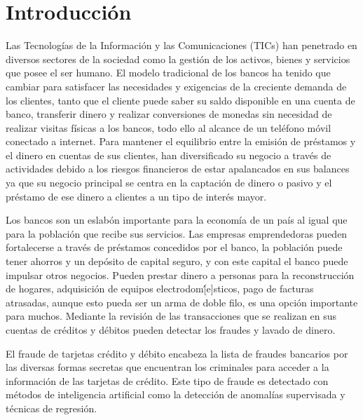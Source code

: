 \section*{Introducci\'{o}n}

 Las Tecnolog\'{i}as de la Informaci\'{o}n y las Comunicaciones (TICs) han penetrado en diversos sectores de la sociedad como la gesti\'{o}n de los activos, bienes y servicios que posee el ser humano. El modelo tradicional de los bancos ha tenido que cambiar para satisfacer las necesidades y exigencias de la creciente demanda de los clientes, tanto que el cliente puede saber su saldo disponible en una cuenta de banco, transferir dinero y realizar conversiones de monedas sin necesidad de realizar visitas f\'{i}sicas a los bancos, todo ello al alcance de un tel\'{e}fono m\'{o}vil conectado a internet. Para mantener el equilibrio entre la emisi\'{o}n de pr\'{e}stamos y el dinero en cuentas de sus clientes, han diversificado su negocio a trav\'{e}s de actividades debido a los riesgos financieros de estar apalancados en sus balances ya que su negocio principal se centra en la captaci\'{o}n de dinero o pasivo y el pr\'{e}stamo de ese dinero a clientes a un tipo de inter\'{e}s mayor.

 Los bancos son un eslab\'{o}n importante para la econom\'{i}a de un pa\'{i}s al igual que para la poblaci\'{o}n que recibe sus servicios. Las empresas emprendedoras pueden fortalecerse a trav\'{e}s de pr\'{e}stamos concedidos por el banco, la poblaci\'{o}n puede tener ahorros y un dep\'{o}sito de capital seguro, y con este capital el banco puede impulsar otros negocios. Pueden prestar dinero a personas para la reconstrucci\'{o}n de hogares, adquisici\'{o}n de equipos electrodom\'[e]sticos, pago de facturas atrasadas, aunque esto pueda ser un arma de doble filo, es una opci\'{o}n importante para muchos. Mediante la revisi\'{o}n de las transacciones que se realizan en sus cuentas de cr\'{e}ditos y d\'{e}bitos pueden detectar los fraudes y lavado de dinero.

 El fraude de tarjetas cr\'{e}dito y d\'{e}bito encabeza la lista de fraudes bancarios por las diversas formas secretas que encuentran los criminales para acceder a la informaci\'{o}n de las tarjetas de cr\'{e}dito. Este tipo de fraude es detectado con m\'{e}todos de inteligencia artificial como la detecci\'{o}n de anomal\'{i}as supervisada y t\'{e}cnicas de regresi\'{o}n.
 
